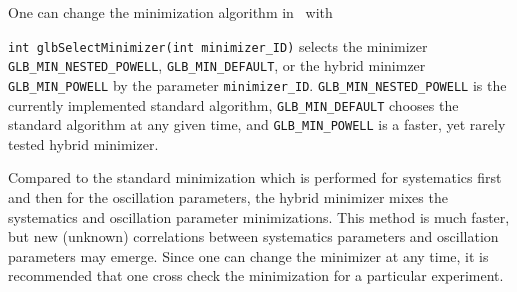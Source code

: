 One can change the minimization algorithm in \GLOBES\ with
\begin{function}
{\tt int glbSelectMinimizer(int minimizer\_ID)} selects the minimizer {\tt GLB\_MIN\_NESTED\_POWELL}, {\tt GLB\_MIN\_DEFAULT}, or the hybrid minimzer {\tt GLB\_MIN\_POWELL} by the parameter {\tt minimizer\_ID}. 
{\tt GLB\_MIN\_NESTED\_POWELL} is the currently implemented standard algorithm, {\tt GLB\_MIN\_DEFAULT} chooses the standard algorithm at any given time, and {\tt GLB\_MIN\_POWELL} is a faster, yet rarely tested hybrid
minimizer.
\end{function}
Compared to the standard minimization which is performed for systematics first and then for the
oscillation parameters, the hybrid minimizer mixes the systematics and oscillation parameter minimizations. This method is much faster, but new (unknown) correlations between systematics parameters and oscillation parameters may emerge. Since one can change the minimizer at any time, it is recommended that one cross check the minimization for a particular experiment.

